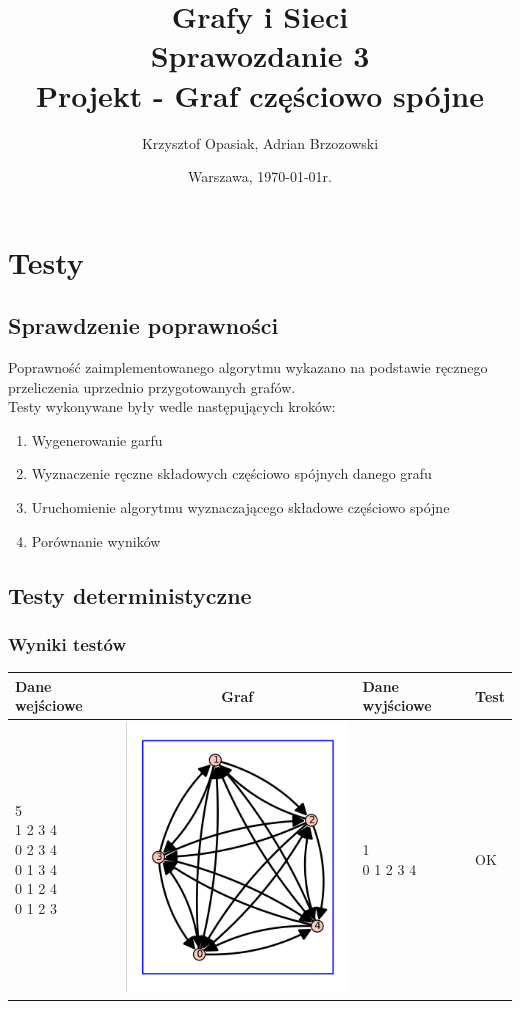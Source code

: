 \documentclass[a4paper,10pt]{article}
\title{{\textbf{Grafy i Sieci}}\\[1ex]
       {\Large Sprawozdanie 3}\\[-1ex]
       {\Large Projekt - Graf częściowo spójne}}
\author{Krzysztof Opasiak, Adrian Brzozowski}
\date{Warszawa, \today r.}
\begin{document}
\maketitle

\section{Testy}
\subsection{Sprawdzenie poprawności}

Poprawność zaimplementowanego algorytmu wykazano na podstawie ręcznego przeliczenia uprzednio przygotowanych grafów.\\

Testy wykonywane były wedle następujących kroków:
\begin{enumerate}
\item Wygenerowanie garfu
\item Wyznaczenie ręczne składowych częściowo spójnych danego grafu
\item Uruchomienie algorytmu wyznaczającego składowe częściowo spójne
\item Porównanie wyników
\end{enumerate}

\subsection{Testy deterministyczne}
\subsubsection{Wyniki testów}

\begin{center}
\begin{tabular}{|l|c|l|l|}\hline
{\bf Dane wejściowe}&{\bf Graf}&{\bf Dane wyjściowe}&{\bf Test}\\ \hline
\shortstack[l]{
5\\
1 2 3 4\\
0 2 3 4\\
0 1 3 4\\
0 1 2 4\\
0 1 2 3
}
&\includegraphics[width=5 cm]{sample_data}&
\shortstack[l]{
1\\
0 1 2 3 4 
}
&OK\\ \hline
\end{tabular}
\end{center}
\end{document}
